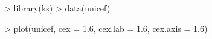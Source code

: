 \documentclass[a4paper,11pt]{article}
\begin{document}
\begin{center}
\begin{Schunk}
\begin{Sinput}
> library(ks)
> data(unicef)
\end{Sinput}
\end{Schunk}
\begin{Schunk}
\begin{Sinput}
> plot(unicef, cex = 1.6, cex.lab = 1.6, cex.axis = 1.6)
\end{Sinput}
\end{Schunk}
\end{center}
\end{document}

